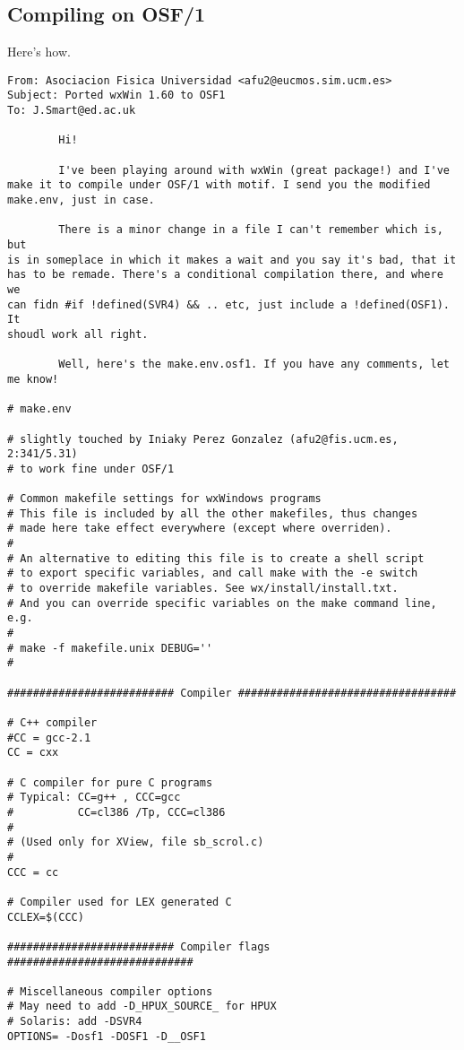 \subsection{Compiling on OSF/1}

Here's how.

\begin{verbatim}
From: Asociacion Fisica Universidad <afu2@eucmos.sim.ucm.es>
Subject: Ported wxWin 1.60 to OSF1
To: J.Smart@ed.ac.uk

        Hi!

        I've been playing around with wxWin (great package!) and I've 
make it to compile under OSF/1 with motif. I send you the modified 
make.env, just in case.

        There is a minor change in a file I can't remember which is, but 
is in someplace in which it makes a wait and you say it's bad, that it 
has to be remade. There's a conditional compilation there, and where we 
can fidn #if !defined(SVR4) && .. etc, just include a !defined(OSF1). It 
shoudl work all right.

        Well, here's the make.env.osf1. If you have any comments, let me know!

# make.env

# slightly touched by Iniaky Perez Gonzalez (afu2@fis.ucm.es, 2:341/5.31) 
# to work fine under OSF/1

# Common makefile settings for wxWindows programs
# This file is included by all the other makefiles, thus changes 
# made here take effect everywhere (except where overriden).
#
# An alternative to editing this file is to create a shell script
# to export specific variables, and call make with the -e switch
# to override makefile variables. See wx/install/install.txt.
# And you can override specific variables on the make command line, e.g.
#
# make -f makefile.unix DEBUG=''
#

########################## Compiler ##################################

# C++ compiler
#CC = gcc-2.1
CC = cxx

# C compiler for pure C programs
# Typical: CC=g++ , CCC=gcc
#          CC=cl386 /Tp, CCC=cl386
#
# (Used only for XView, file sb_scrol.c)
#
CCC = cc

# Compiler used for LEX generated C
CCLEX=$(CCC)

########################## Compiler flags #############################

# Miscellaneous compiler options
# May need to add -D_HPUX_SOURCE_ for HPUX
# Solaris: add -DSVR4
OPTIONS= -Dosf1 -DOSF1 -D__OSF1


\end{verbatim}
